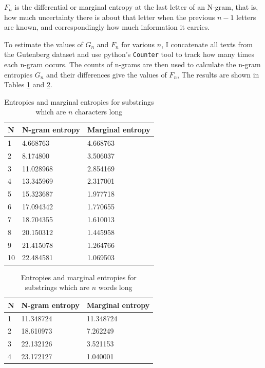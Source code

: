$F_n$ is the differential or marginal entropy at the last letter of an N-gram, that is, how much uncertainty there is about that letter when the previous $n-1$ letters are known, and correspondingly how much information it carries.

To estimate the values of $G_n$ and $F_n$ for various $n$, I concatenate all texts from the Gutenberg dataset and use python's \texttt{Counter} tool to track how many times each n-gram occurs. The counts of n-grams are then used to calculate the n-gram entropies $G_n$ and their differences give the values of $F_n$, The results are shown in Tables \ref{tab:n_gram_entropy} and \ref{tab:n_word_entropy}.


\begin{table}[h]
\centering
\begin{tabular}{ |p{1cm}||p{3cm}|p{3cm}|  }
 \hline
    N  & N-gram entropy & Marginal entropy\\
 \hline
    1  &     4.668763   &    4.668763\\
    2  &     8.174800   &    3.506037\\
    3  &    11.028968   &    2.854169\\
    4  &    13.345969   &    2.317001\\
    5  &    15.323687   &    1.977718\\
    6  &    17.094342   &    1.770655\\
    7  &    18.704355   &    1.610013\\
    8  &    20.150312   &    1.445958\\
    9  &    21.415078   &    1.264766\\
    10 &    22.484581   &    1.069503\\
 \hline
\end{tabular}
\caption{Entropies and marginal entropies for substrings which are $n$ characters long
\label{tab:n_gram_entropy}}
\end{table}



\begin{table}[h]
\centering
\begin{tabular}{ |p{1cm}||p{3cm}|p{3cm}|  }
 \hline
    N  & N-gram entropy & Marginal entropy\\
 \hline
    1  &    11.348724   &     11.348724\\
    2  &    18.610973   &      7.262249\\
    3  &    22.132126   &      3.521153\\
    4  &    23.172127   &      1.040001\\
 \hline
\end{tabular}
\caption{Entropies and marginal entropies for substrings which are $n$ words long
\label{tab:n_word_entropy}}
\end{table}

